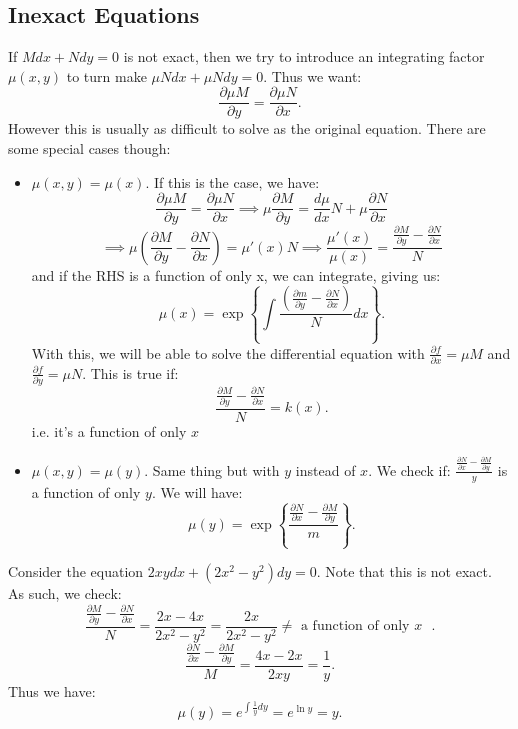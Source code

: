 \documentclass[../main/main.tex]{subfiles}
\begin{document}
\subsection{Inexact Equations}
If $M dx + Ndy = 0$ is not exact, then we try to introduce an integrating factor $\mu(x,y)$ to turn make $\mu N dx+\mu N dy = 0$. Thus we want: \[
 \frac{\partial \mu M}{\partial y}  = \frac{\partial \mu N}{\partial x} 
.\] However this is usually as difficult to solve as the original equation. There are some special cases though: 
\begin{itemize}
	\item $\mu(x,y) = \mu(x)$. If this is the case, we have: \[
	\frac{\partial \mu M}{\partial y}  = \frac{\partial \mu N}{\partial x} 
	\implies \mu \frac{\partial M}{\partial y}  = \frac{d \mu}{d x} N + \mu \frac{\partial N}{\partial x} 
	\] \[
	\implies \mu\left( \frac{\partial M}{\partial y} -\frac{\partial N}{\partial x}  \right) =\mu'(x)N \implies \frac{\mu'(x)}{\mu(x)}= \frac{\frac{\partial M}{\partial y} -\frac{\partial N}{\partial x} }{N}
	\] and if the RHS is a function of only x, we can integrate, giving us: \[
	\mu(x) = \exp\left\{\int \frac{\left( \frac{\partial m}{\partial y} -\frac{\partial N}{\partial x}  \right) }{N}dx\right\}
	.\] With this, we will be able to solve the differential equation with $\frac{\partial f}{\partial x} =\mu M$ and $\frac{\partial f}{\partial y} =\mu N$. This is true if: \[
	\frac{\frac{\partial M}{\partial y} -\frac{\partial N}{\partial x} }{N} = k(x)
	.\] i.e. it's a function of only $x$
\item $\mu(x,y)=\mu(y)$. Same thing but with $y$ instead of  $x$. We check if: $\frac{\frac{\partial N}{\partial x} -\frac{\partial M}{\partial y} }{y}$ is a function of only $y$. We will have:  \[
		\mu(y) = \exp\left\{\frac{\frac{\partial N}{\partial x} -\frac{\partial M}{\partial y} }{m}\right\}
.\] 
\end{itemize}
\begin{example}
	Consider the equation $2xydx+(2x^2-y^2)dy=0$. Note that this is not exact. As such, we check: \[
		\frac{\frac{\partial M}{\partial y} -\frac{\partial N}{\partial x} }{N}=\frac{2x-4x}{2x^2-y^2}=\frac{2x}{2x^2-y^2}\neq \text{ a function of only $x$ }
	.\] \[
	\frac{\frac{\partial N}{\partial x} -\frac{\partial M}{\partial y} }{M}=\frac{4x-2x}{2xy}=\frac{1}{y}
	.\] Thus we have: \[
	\mu(y) = e^{\int \frac{1}{y}dy}=e^{\ln y}= y
	.\] 
\end{example}
\end{document}
